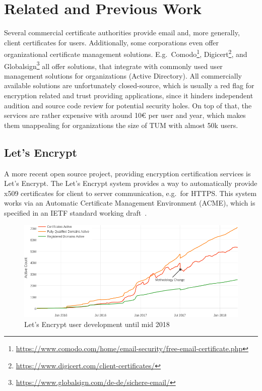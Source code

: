 \chapter{Related and Previous Work}\label{ch:relatedWork}
Several commercial certificate authorities provide email and, more generally, client certificates for users.
Additionally, some corporations even offer organizational certificate management solutions.
E.g.\ Comodo\footnote{\url{https://www.comodo.com/home/email-security/free-email-certificate.php}},
Digicert\footnote{\url{https://www.digicert.com/client-certificates/}}, and
Globalsign\footnote{\url{https://www.globalsign.com/de-de/sichere-email/}} all offer solutions, that integrate with
commonly used user management solutions for organizations (Active Directory).
All commercially available solutions are unfortunately closed-source, which is usually a red flag for encryption related
and trust providing applications, since it hinders independent audition and source code review for potential security
holes.
On top of that, the services are rather expensive with around 10€ per user and year, which makes them unappealing for
organizations the size of TUM with almost 50k users.

\section*{Let's Encrypt}
A more recent open source project, providing encryption certification services is Let's Encrypt.
The Let's Encrypt system provides a way to automatically provide x509 certificates for client to server communication,
e.g.\ for HTTPS\@.
This system works via an Automatic Certificate Management Environment (ACME), which is specified in an IETF standard
working draft~\cite{letsencrypteacme}.

\begin{figure}[hb]
    \centering
    \includegraphics[width=.905\textwidth]{figures/letsencryptusers.png}
    \caption{Let's Encrypt user development until mid 2018~\cite{letsencryptstats}}
    \label{fig:letsencrypt}
\end{figure}

